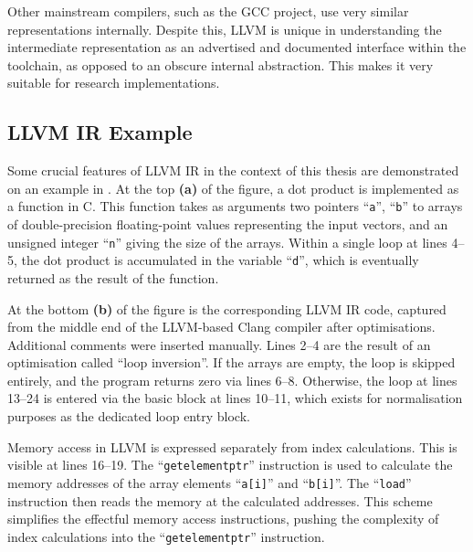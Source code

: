     Other mainstream compilers, such as the GCC project, use very similar
    representations internally.
    Despite this, LLVM is unique in understanding the intermediate
    representation as an advertised and documented interface within the
    toolchain, as opposed to an obscure internal abstraction.
    This makes it very suitable for research implementations.

\subsection{LLVM IR Example}

    Some crucial features of LLVM IR in the context of this thesis are
    demonstrated on an example in .
    At the top {\bf (a)} of the figure, a dot product is implemented as a
    function in C.
    This function takes as arguments two pointers ``{\tt a}'', ``{\tt b}'' to
    arrays of double-precision floating-point values representing the input
    vectors, and an unsigned integer ``{\tt n}'' giving the size of the arrays.
    Within a single loop at lines 4--5, the dot product is accumulated in
    the variable ``{\tt d}'', which is eventually returned as the result of the
    function.

    At the bottom {\bf (b)} of the figure is the corresponding LLVM IR code,
    captured from the middle end of the LLVM-based Clang compiler after
    optimisations.
    Additional comments were inserted manually.
    Lines 2--4 are the result of an optimisation called ``loop inversion''.
    If the arrays are empty, the loop is skipped entirely, and the program
    returns zero via lines 6--8.
    Otherwise, the loop at lines 13--24 is entered via the basic block at lines
    10--11, which exists for normalisation purposes as the dedicated loop entry
    block.

    Memory access in LLVM is expressed separately from index calculations.
    This is visible at lines 16--19.
    The ``{\tt getelementptr}'' instruction is used to calculate the memory
    addresses of the array elements ``{\tt a[i]}'' and ``{\tt b[i]}''.
    The ``{\tt load}'' instruction then reads the memory at the calculated
    addresses.
    This scheme simplifies the effectful memory access instructions, pushing the
    complexity of index calculations into the ``{\tt getelementptr}''
    instruction.

